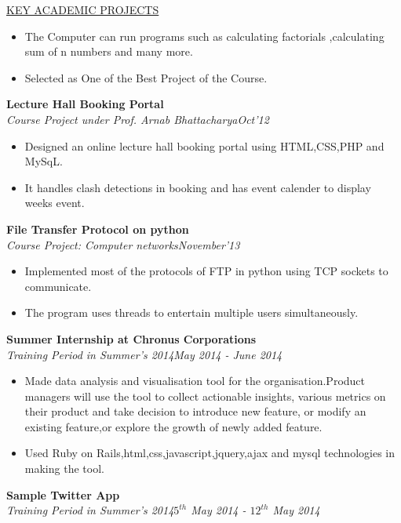 \documentclass[10pt]{res}
\begin{document}
\begin{resume}
\begin{section}{\underline{KEY ACADEMIC PROJECTS}}
\begin{itemize}
{The 8 bit instructions can be hard coded in the text segment of the program or manually given by using FPGA.
}
\item{
The Computer can run programs such as calculating factorials ,calculating sum of n numbers and many more.
}
\item{
Selected as One of the Best Project of the Course.
}
\end{itemize}
{\bf Lecture Hall Booking Portal}\\
\textit{Course Project under Prof. Arnab Bhattacharya\hfill Oct'12}
\vspace{0.1in}
\begin{itemize}
\item{
Designed an online lecture hall booking portal using HTML,CSS,PHP and MySqL.
}
\item{
It handles clash detections in booking and has event calender to display weeks event.
}
\end{itemize}
{\bf File Transfer Protocol on python}\\
\textit{Course Project: Computer networks\hfill  November'13}
\vspace{0.1in}
\begin{itemize}
\item{
Implemented most of the protocols of FTP in python using TCP sockets to communicate.
}
\item{
The program uses threads to entertain multiple users simultaneously.
}
\end{itemize}
{\bf Summer Internship at Chronus Corporations}\\
\textit{Training Period in Summer's 2014\hfill  May 2014 - June 2014 }
\vspace{0.1in}
\begin{itemize}
\item{
Made data analysis and visualisation tool for the organisation.Product managers will use the tool to collect actionable insights, various metrics on their product and take decision to introduce new feature, or modify an existing feature,or explore the growth of newly added feature.
}
\item{
Used Ruby on Rails,html,css,javascript,jquery,ajax and mysql technologies in making the tool.
}
\end{itemize}
{\bf Sample Twitter App}\\
\textit{Training Period in Summer's 2014\hfill  $5^{th}$ May 2014 - $12^{th}$ May 2014 }
\vspace{0.1in}
\begin{itemize}

\end{itemize}
\end{section}
\end{resume}
\end{document}
